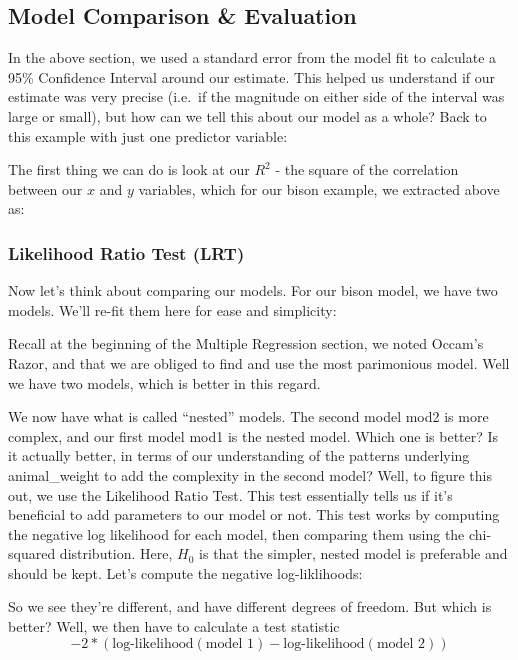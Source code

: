 \documentclass[
]{article}
\begin{document}
\hypertarget{model-comparison-evaluation}{%
\subsection{Model Comparison \&
Evaluation}\label{model-comparison-evaluation}}

In the above section, we used a standard error from the model fit to
calculate a 95\% Confidence Interval around our estimate. This helped us
understand if our estimate was very precise (i.e.~if the magnitude on
either side of the interval was large or small), but how can we tell
this about our model as a whole? Back to this example with just one
predictor variable:

The first thing we can do is look at our \(R^2\) - the square of the
correlation between our \(x\) and \(y\) variables, which for our bison
example, we extracted above as:

\hypertarget{likelihood-ratio-test-lrt}{%
\subsubsection{Likelihood Ratio Test
(LRT)}\label{likelihood-ratio-test-lrt}}

Now let's think about comparing our models. For our bison model, we have
two models. We'll re-fit them here for ease and simplicity:

Recall at the beginning of the Multiple Regression section, we noted
Occam's Razor, and that we are obliged to find and use the most
parimonious model. Well we have two models, which is better in this
regard.

We now have what is called ``nested'' models. The second model mod2 is
more complex, and our first model mod1 is the nested model. Which one is
better? Is it actually better, in terms of our understanding of the
patterns underlying animal\_weight to add the complexity in the second
model? Well, to figure this out, we use the Likelihood Ratio Test. This
test essentially tells us if it's beneficial to add parameters to our
model or not. This test works by computing the negative log likelihood
for each model, then comparing them using the chi-squared distribution.
Here, \(H_0\) is that the simpler, nested model is preferable and should
be kept. Let's compute the negative log-liklihoods:

So we see they're different, and have different degrees of freedom. But
which is better? Well, we then have to calculate a test statistic
\[-2 * (\text{log-likelihood}(\text{model 1}) - \text{log-likelihood}(\text{model 2}))\]
\end{document}
